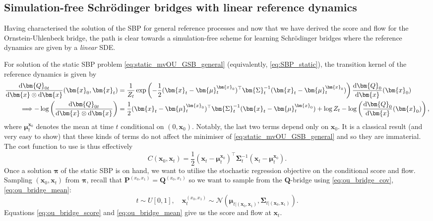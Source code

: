 \documentclass{article}
\newcommand{\diff}{\mathrm{d}}
\theoremstyle{newstyle}
\begin{document}
\subsection{Simulation-free Schr\"odinger bridges with linear reference dynamics}

Having characterised the solution of the SBP for general reference processes and now that we have derived the score and flow for the Ornstein-Uhlenbeck bridge, the path is clear towards a simulation-free scheme for learning Schr\"odinger bridges where the reference dynamics are given by a \emph{linear} SDE.

For solution of the static SBP problem \eqref{eq:static_mvOU_GSB_general} (equivalently, \eqref{eq:SBP_static}), the transition kernel of the reference dynamics is given by
\begin{align} 
  \frac{\diff \bm{Q}_{0t}}{\diff \bm{x} \otimes \diff \bm{x}}(\bm{x}_0, \bm{x}_t) &= \frac{1}{Z_t} \exp\left( -\frac{1}{2} (\bm{x}_t - \bm{\mu}_t^{\bm{x}_0})^\top \bm{\Sigma}_t^{-1} (\bm{x}_t - \bm{\mu}_t^{\bm{x}_0}) \right) \frac{\diff\bm{Q}_0}{\diff \bm{x}}(\bm{x}_0) \notag \\
  \Longrightarrow -\log\left( \frac{\diff \bm{Q}_{0t}}{\diff \bm{x} \otimes \diff \bm{x}} \right) &= \frac{1}{2} (\bm{x}_t - \bm{\mu}_t^{\bm{x}_0})^\top \bm{\Sigma}_t^{-1} (\bm{x}_t - \bm{\mu}_t^{\bm{x}_0}) + \log Z_t - \log \left( \frac{\diff\bm{Q}_0}{\diff \bm{x}}(\bm{x}_0) \right), 
\end{align}
where $\bm{\mu}_t^{\bm{x}_0}$ denotes the mean at time $t$ conditional on $(0, \bm{x}_0)$. 
Notably, the last two terms depend only on $\bm{x}_0$. It is a classical result (and very easy to show) that these kinds of terms do not affect the minimiser of \eqref{eq:static_mvOU_GSB_general} and so they are immaterial. The cost function to use is thus effectively
\begin{equation}
  C(\bm{x}_0, \bm{x}_t) = \frac{1}{2} (\bm{x}_t - \bm{\mu}_t^{\bm{x}_0})^\top \bm{\Sigma}_t^{-1} (\bm{x}_t - \bm{\mu}_t^{\bm{x}_0}). 
\end{equation}
Once a solution $\bm{\pi}$ of the static SBP is on hand, we want to utilise the stochastic regression objective on the conditional score and flow.
Sampling $(\bm{x}_0, \bm{x}_t)$ from $\bm{\pi}$, recall that $\bm{P}^{(x_0, x_1)} = \bm{Q}^{(x_0, x_1)}$ so we want to sample from the $\bm{Q}$-bridge using \eqref{eq:ou_bridge_cov}, \eqref{eq:ou_bridge_mean}:
\begin{equation}
  t \sim U[0, 1], \quad \bm{x}_t^{(x_0, x_1)} \sim \mathcal{N}(\bm{\mu}_{t | (\bm{x}_0, \bm{x}_1)}, \bm{\Sigma}_{t|(\bm{x}_0, \bm{x}_1)}). 
\end{equation}
Equations \eqref{eq:ou_bridge_score} and \eqref{eq:ou_bridge_mean} give us the score and flow at $\bm{x}_t$. 
\end{document}
